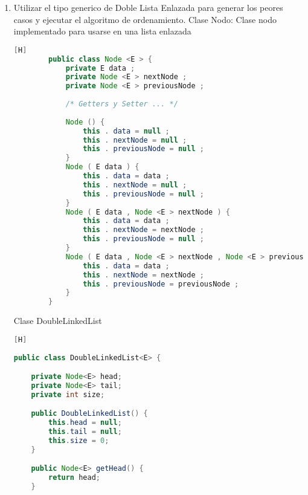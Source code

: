 \begin{enumerate}[{Ejercicio} 1.]
	\begin{lstlisting}[language=java, caption={FOR}][H]
		// Generan peores casos y se agregan al ArrayList
        for(int n = 1; n <= tamano ; n++){
            casos.add(generarPeorCaso(n));
        }
        
        Iterator<LinkedList<Integer>> puntero = casos.iterator();
        while(puntero.hasNext()){
            oS.println(String.valueOf(insertionSort(puntero.next())));
        }
        oS.close();
        
        JavaPlot p = new JavaPlot();
        p.addPlot("\""+archivoInsercion+ "\" with lines");
        p.plot();
    }
	\end{lstlisting}
	
	
	
	\item Utilizar el tipo generico de Doble Lista Enlazada para generar los peores casos y ejecutar
	el algoritmo de ordenamiento.
	Clase Nodo: Clase nodo implementado para usarse en una lista enlazada
	

	
	\begin{lstlisting}[language=java, caption={caption}][H]
		public class Node <E > {
			private E data ;
			private Node <E > nextNode ;
			private Node <E > previousNode ;
			
			/* Getters y Setter ... */
			
			Node () {
				this . data = null ;
				this . nextNode = null ;
				this . previousNode = null ;
			}
			Node ( E data ) {
				this . data = data ;
				this . nextNode = null ;
				this . previousNode = null ;
			}
			Node ( E data , Node <E > nextNode ) {
				this . data = data ;
				this . nextNode = nextNode ;
				this . previousNode = null ;
			}
			Node ( E data , Node <E > nextNode , Node <E > previousNode ) {
				this . data = data ;
				this . nextNode = nextNode ;
				this . previousNode = previousNode ;
			}
		}
	\end{lstlisting}
	Clase DoubleLinkedList
	\begin{lstlisting}[language=java, caption={DoubleLinkedList}][H]
		
public class DoubleLinkedList<E> {

    private Node<E> head;
    private Node<E> tail;
    private int size;

    public DoubleLinkedList() {
        this.head = null;
        this.tail = null;
        this.size = 0;
    }

    public Node<E> getHead() {
        return head;
    }


\end{lstlisting}
\end{enumerate}
